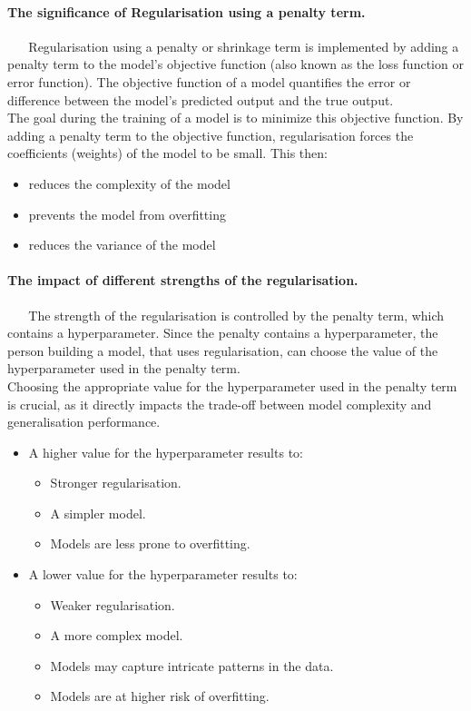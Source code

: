 \documentclass[12pt]{article}
\begin{document}
\paragraph{The significance of Regularisation using a penalty term.}~
\newline~
Regularisation using a penalty or shrinkage term is implemented by adding a penalty term to the model's objective function (also known as the loss function or error function).
The objective function of a model quantifies the error or difference between the model's predicted output and the true output.
\\ The goal during the training of a model is to minimize this objective function. By adding a penalty term to the objective function, regularisation forces the coefficients (weights) of the model to be small. This then:
\begin{itemize}
    \item reduces the complexity of the model
    \item prevents the model from overfitting
    \item reduces the variance of the model
\end{itemize} 

\paragraph{The impact of different strengths of the regularisation.}~
\newline~
The strength of the regularisation is controlled by the penalty term, which contains a hyperparameter. Since the penalty contains a hyperparameter, the person building a model,
that uses regularisation, can choose the value of the hyperparameter used in the penalty term. \\ Choosing the appropriate value for the hyperparameter used in the penalty term is crucial, as it directly impacts the trade-off
between model complexity and generalisation performance.
\begin{itemize}
    \item A higher value for the hyperparameter results to:
    \begin{itemize}
        \item Stronger regularisation.
        \item A simpler model.
        \item Models are less prone to overfitting.
    \end{itemize}
    \item A lower value for the hyperparameter results to:
    \begin{itemize}
        \item Weaker regularisation.
        \item A more complex model.
        \item Models may capture intricate patterns in the data.
        \item Models are at higher risk of overfitting.
    \end{itemize}
\end{itemize}
\end{document}
